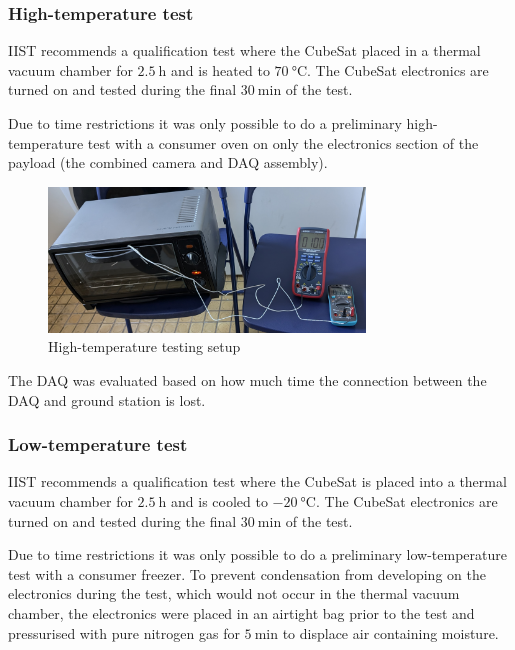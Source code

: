 \documentclass[a4paper,11pt]{article}
\begin{document}
\subsubsection{High-temperature test}
\label{sec:htemp-test-framework}
IIST recommends a qualification test where the CubeSat placed in a thermal vacuum chamber for $\SI{2.5}{\hour}$ and is heated to $\SI{70}{\degreeCelsius}$. The CubeSat electronics are turned on and tested during the final $\SI{30}{\minute}$ of the test.

Due to time restrictions it was only possible to do a preliminary high-temperature test with a consumer oven on only the electronics section of the payload (the combined camera and DAQ assembly).

\begin{figure}[H]
  \centering
  \includegraphics[width=0.75\textwidth]{images/oven_test.jpg}
  \caption{High-temperature testing setup}
  \label{fig:temperature-testing-oven}
\end{figure}

The DAQ was evaluated based on how much time the connection between the DAQ and ground station is lost.

\subsubsection{Low-temperature test}
\label{sec:ltemp-test-framework}
IIST recommends a qualification test where the CubeSat is placed into a thermal vacuum chamber for $\SI{2.5}{\hour}$ and is cooled to $\SI{-20}{\degreeCelsius}$. The CubeSat electronics are turned on and tested during the final $\SI{30}{\minute}$ of the test.

Due to time restrictions it was only possible to do a preliminary low-temperature test with a consumer freezer. To prevent condensation from developing on the electronics during the test, which would not occur in the thermal vacuum chamber, the electronics were placed in an airtight bag prior to the test and pressurised with pure nitrogen gas for $\SI{5}{\minute}$ to displace air containing moisture.
\end{document}
